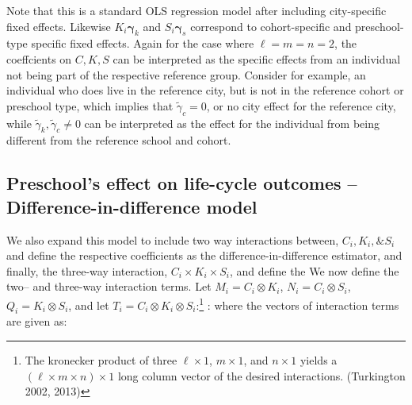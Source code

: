 \documentclass[10pt]{article}
\begin{document}
Note that this is a standard OLS regression model after including city-specific fixed effects. Likewise  $K_i \boldsymbol{\gamma}_k$ and $S_i \boldsymbol{\gamma}_s$ correspond to cohort-specific and preschool-type specific fixed effects. Again for the case where $\ell = m = n = 2$, the coeffcients on $C, K, S$ can be interpreted as the specific effects from an individual not being part of the respective reference group. Consider for example, an individual who does live in the reference city, but is not in the reference cohort or preschool type, which implies that  $\tilde{\gamma}_c = 0$, or no city effect for the reference city, while $\tilde{\gamma}_k, \tilde{\gamma}_c \neq 0$ can be interpreted as the effect for the individual from being different from the reference school and cohort. 

\subsection{Preschool's effect on life-cycle outcomes -- Difference-in-difference model}

We also expand this model to include two way interactions between, $C_i, K_i, \& S_i$ and define the respective coefficients as the difference-in-difference estimator, and finally, the three-way interaction, $C_i \times K_i \times S_i$, and define the  We now define the two-- and three-way interaction terms. Let $M_i = C_i \otimes K_i$,  $N_i = C_i \otimes S_i$, $Q_i = K_i \otimes S_i$, and let $T_i = C_i \otimes K_i \otimes S_i$:\footnote{The kronecker product of three $\ell \times 1$, $m \times 1$, and $n \times 1$ yields a $(\ell \times m \times n) \times 1$ long column vector of the desired interactions. (Turkington 2002, 2013)}  : where the vectors of interaction terms are given as:
\end{document}
